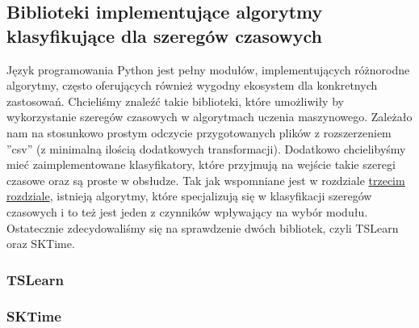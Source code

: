 \subsection{Biblioteki implementujące algorytmy klasyfikujące dla szeregów czasowych}
    \label{sec:mllibs}
    Język programowania Python jest pełny modułów, implementujących różnorodne algorytmy, często oferujących również wygodny ekosystem dla konkretnych zastosowań. Chcieliśmy znaleźć takie biblioteki, które umożliwiły by wykorzystanie szeregów czasowych w algorytmach uczenia maszynowego. Zależało nam na stosunkowo prostym odczycie przygotowanych plików z rozszerzeniem ''csv'' (z minimalną ilością dodatkowych transformacji). Dodatkowo chcielibyśmy mieć zaimplementowane klasyfikatory, które przyjmują na wejście takie szeregi czasowe oraz są proste w obsłudze. Tak jak wspomniane jest w rozdziale \hyperref[chap:theory]{trzecim rozdziale}, istnieją algorytmy, które specjalizują się w klasyfikacji szeregów czasowych i to też jest jeden z czynników wpływający na wybór modułu. Ostatecznie zdecydowaliśmy się na sprawdzenie dwóch bibliotek, czyli TSLearn\cite{TSLearn} oraz SKTime\cite{SKTime_soft}\cite{SKTIME1}. 
\subsubsection{TSLearn}
\subsubsection{SKTime}
